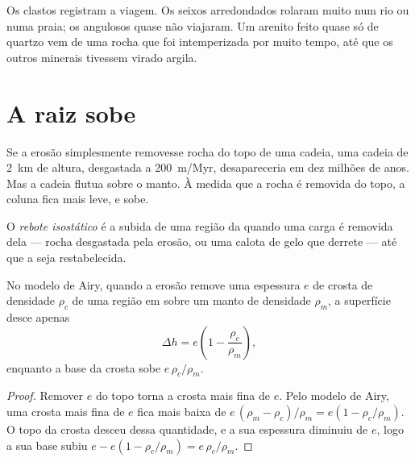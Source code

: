 Os clastos registram a viagem. Os seixos arredondados rolaram muito num rio
ou numa praia; os angulosos quase não viajaram. Um arenito feito quase só
de quartzo vem de uma rocha que foi intemperizada por muito tempo, até que
os outros minerais tivessem virado argila.

\section{A raiz sobe}

Se a erosão simplesmente removesse rocha do topo de uma cadeia, uma cadeia
de \qty{2}{km} de altura, desgastada a \qty{200}{m/Myr}, desapareceria em
dez milhões de anos. Mas a cadeia flutua sobre o manto. À medida que a rocha
é removida do topo, a coluna fica mais leve, e sobe.

\begin{definition}\label{def:g12:destruction-of-mountains:rebound}
O \emph{rebote isostático} é a subida de uma região
da  quando uma carga é removida dela --- rocha desgastada pela
erosão, ou uma calota de gelo que derrete --- até que a  seja
restabelecida.
\end{definition}

\begin{proposition}\label{prop:g12:destruction-of-mountains:rebound}
No modelo de Airy, quando a erosão remove uma espessura $e$ de crosta de
densidade $\rho_c$ de uma região em  sobre um manto de densidade
$\rho_m$, a superfície desce apenas
\[
  \Delta h = e\left(1 - \frac{\rho_c}{\rho_m}\right),
\]
enquanto a base da crosta sobe $e\,\rho_c/\rho_m$.
\end{proposition}

\begin{proof}
Remover $e$ do topo torna a crosta mais fina de $e$. Pelo modelo de Airy,
uma crosta mais fina de $e$ fica mais baixa de $e\,(\rho_m - \rho_c)/\rho_m = e(1 -
\rho_c/\rho_m)$. O topo da crosta desceu dessa quantidade, e a sua espessura
diminuiu de $e$, logo a sua base subiu $e - e(1 -
\rho_c/\rho_m) = e\,\rho_c/\rho_m$.
\end{proof}

